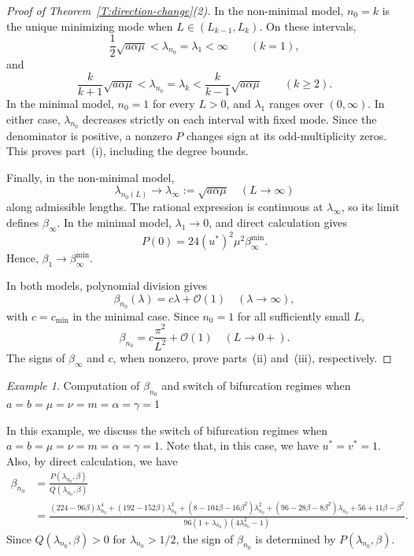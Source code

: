 \documentclass[11pt]{article} %
\theoremstyle{remark}
\theoremstyle{remark}
\newtheorem{example}{Example}[section]
\numberwithin{equation}{section}
\numberwithin{figure}{section}
\numberwithin{table}{section}
\begin{document}
\begin{proof}[Proof of
  Theorem~\ref{T:direction-change}(2)]
  In the non-minimal model, $n_0 = k$ is the unique minimizing mode when $L \in
  (L_{k-1}, L_k)$. On these intervals,
  \[
    \frac12\sqrt{a\alpha\mu}<\lambda_{n_0}=\lambda_1<\infty \qquad(k=1),
  \]
  and
  \[
    \frac{k}{k+1}\sqrt{a\alpha\mu} <\lambda_{n_0}=\lambda_k<
    \frac{k}{k-1}\sqrt{a\alpha\mu} \qquad(k\ge2).
  \]
  In the minimal model, $n_0 = 1$ for every $L > 0$, and $\lambda_1$ ranges over
  $(0, \infty)$. In either case, $\lambda_{n_0}$ decreases strictly on each
  interval with fixed mode. Since the denominator is positive, a nonzero $P$
  changes sign at its odd-multiplicity zeros. This proves part~(i), including
  the degree bounds.

  Finally, in the non-minimal model,
  \[
    \lambda_{n_0(L)}\longrightarrow \lambda_\infty:=\sqrt{a\alpha\mu}
    \quad(L\to\infty)
  \]
  along admissible lengths. The rational expression is continuous at
  $\lambda_\infty$, so its limit defines $\beta_\infty$. In the minimal model,
  $\lambda_1 \to 0$, and direct calculation gives
  \[
    P(0)=24(u^*)^2\mu^2\beta_\infty^{\min}.
  \]
  Hence, $\beta_1 \to \beta_\infty^{\min}$.

  In both models, polynomial division gives
  \[
    \beta_{n_0}(\lambda)=c\lambda+\mathcal{O}(1) \quad(\lambda\to\infty),
  \]
  with $c = c_{\min}$ in the minimal case. Since $n_0 = 1$ for all sufficiently
  small $L$,
  \[
    \beta_{n_0} =c\frac{\pi^2}{L^2}+\mathcal{O}(1) \quad(L\to0+).
  \]
  The signs of $\beta_\infty$ and $c$, when nonzero, prove parts~(ii) and~(iii),
  respectively.
\end{proof}


\begin{example}\label{Ex:example-1}
  Computation of $\beta_{n_0}$ and switch of bifurcation regimes when $a = b =
  \mu = \nu = m = \alpha = \gamma = 1$
\end{example}


In this example, we discuss the switch of bifurcation regimes when $a = b = \mu
= \nu = m = \alpha = \gamma = 1$. Note that, in this case, we have $u^* = v^* =
1$. Also, by direct calculation, we have
\begin{align*}
  \beta_{n_0}&=\frac{P(\lambda_{n_0},\beta)}{Q(\lambda_{n_0},\beta)}\\
  &=\frac{
  (224\!-\!96\beta)\lambda_{n_0}^4\!+\!(192\!-\!152\beta)\lambda_{n_0}^3 \!+\!(8\!-\!104\beta\!-\!16\beta^2)\lambda_{n_0}^2
  \!+\!(96\!-\!28\beta\!-8\!\beta^2)\lambda_{n_0}\!+\!56\!+\!11\beta\!-\!\beta^2
  }{96(1+\lambda_{n_0})(4\lambda_{n_0}^2-1)}.
\end{align*}
Since $Q(\lambda_{n_0}, \beta) > 0$ for $\lambda_{n_0} > 1/2$, the sign of
$\beta_{n_0}$ is determined by $P(\lambda_{n_0}, \beta)$.
\end{document}

